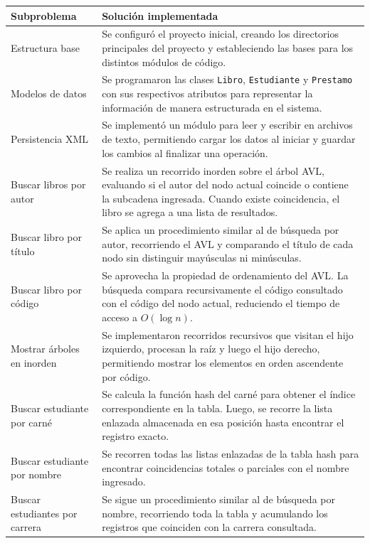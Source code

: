 \documentclass[11pt]{article}
\begin{document}
\begin{longtable}{p{} p{}}
\toprule
\textbf{Subproblema} & \textbf{Solución implementada} \\
\midrule

Estructura base & Se configuró el proyecto inicial, creando los directorios principales del proyecto y estableciendo las bases para los distintos módulos de código. \\
\midrule
Modelos de datos & Se programaron las clases \texttt{Libro}, \texttt{Estudiante} y \texttt{Prestamo} con sus respectivos atributos para representar la información de manera estructurada en el sistema. \\
\midrule
Persistencia XML & Se implementó un módulo para leer y escribir en archivos de texto, permitiendo cargar los datos al iniciar y guardar los cambios al finalizar una operación. \\
\midrule
Buscar libros por autor & Se realiza un recorrido inorden sobre el árbol AVL, evaluando si el autor del nodo actual coincide o contiene la subcadena ingresada. Cuando existe coincidencia, el libro se agrega a una lista de resultados. \\
\midrule
Buscar libro por título & Se aplica un procedimiento similar al de búsqueda por autor, recorriendo el AVL y comparando el título de cada nodo sin distinguir mayúsculas ni minúsculas. \\
\midrule
Buscar libro por código & Se aprovecha la propiedad de ordenamiento del AVL. La búsqueda compara recursivamente el código consultado con el código del nodo actual, reduciendo el tiempo de acceso a $O(\log n)$. \\
\midrule
Mostrar árboles en inorden & Se implementaron recorridos recursivos que visitan el hijo izquierdo, procesan la raíz y luego el hijo derecho, permitiendo mostrar los elementos en orden ascendente por código. \\
\midrule
Buscar estudiante por carné & Se calcula la función hash del carné para obtener el índice correspondiente en la tabla. Luego, se recorre la lista enlazada almacenada en esa posición hasta encontrar el registro exacto. \\
\midrule
Buscar estudiante por nombre & Se recorren todas las listas enlazadas de la tabla hash para encontrar coincidencias totales o parciales con el nombre ingresado. \\
\midrule
Buscar estudiantes por carrera & Se sigue un procedimiento similar al de búsqueda por nombre, recorriendo toda la tabla y acumulando los registros que coinciden con la carrera consultada. \\

\end{longtable}
\end{document}
